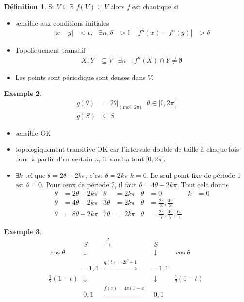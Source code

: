 \documentclass[11pt,a4paper]{article}
\newcommand{\R}{\mathbb{R}}
\theoremstyle{definition}
\newtheorem{mydef}{Définition}
\newtheorem{myexem}[mydef]{Exemple}
\begin{document}
\begin{mydef}
  Si $V \subseteq \R$ $f(V) \subseteq V$ alors $f$ est chaotique si
  \begin{itemize}
    \item sensible aux conditions initiales
      \begin{align*}
        |x-y| & < \epsilon, & \exists n, \delta & > 0 & |f^n(x) - f^n(y)| & > \delta
      \end{align*}
    \item Topoliquement transitif
      \begin{align*}
        X,Y & \subseteq V & \exists n & : f^n(X) \cap Y \neq \emptyset
      \end{align*}
    \item Les points sont périodique sont denses dans $V$.
  \end{itemize}
\end{mydef}

\begin{myexem}
  \begin{align*}
    g(\theta) & = \left.2\theta\right|_{\pmod{2\pi}} & \theta \in [0,2\pi[\\
    g(S) & \subseteq S
  \end{align*}
  \begin{itemize}
    \item sensible OK
    \item topologiquement transitive OK car l'intervale double de taille à chaque fois donc à partir d'un certain
      $n$, il vaudra tout $[0,2\pi[$.
    \item $\exists k$ tel que $\theta = 2\theta - 2k\pi$, c'est $\theta = 2k\pi$ $k = 0$.
      Le seul point fixe de période 1 est $\theta = 0$.
      Pour ceux de période 2, il faut $\theta = 4\theta - 2k\pi$. Tout cela donne
      \begin{align*}
        \theta & = 2\theta - 2k\pi & \theta & = 2k\pi & \theta & = 0 & k & = 0\\
        \theta & = 4\theta - 2k\pi & 3\theta & = 2k\pi & \theta & = \frac{2\pi}{3},\frac{4\pi}{3}\\
        \theta & = 8\theta - 2k\pi & 7\theta & = 2k\pi & \theta & = \frac{2\pi}{7},\frac{4\pi}{7},\frac{6\pi}{7}
      \end{align*}
  \end{itemize}
\end{myexem}

\begin{myexem}
  $$
  \begin{array}{rcccl}
    & S & \stackrel{g}{\rightarrow} & S&\\
    \cos\theta& \downarrow & & \downarrow &\cos\theta\\
              & -1,1 & \stackrel{q(t) = 2t^2-1}{\rightarrow} & -1,1&\\
    \frac{1}{2}(1-t)& \downarrow & & \downarrow &\frac{1}{2}(1-t)\\
                    & 0,1 & \stackrel{f(x)=4x(1-x)}{\rightarrow} & 0,1&
  \end{array}
  $$
\end{myexem}
\end{document}

